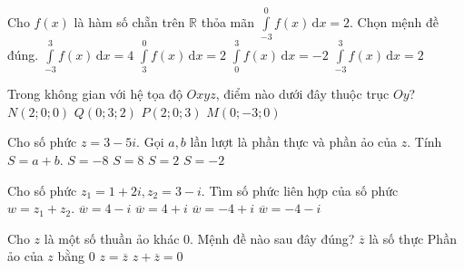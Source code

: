 \begin{ex}%
Cho $f(x)$ là hàm số chẵn trên $\mathbb{R}$ thỏa mãn $\displaystyle\int\limits_{-3}^0f(x)\mathrm{\,d}x=2$. Chọn mệnh đề đúng.
\choice
{\True $\displaystyle\int\limits_{-3}^3f(x)\mathrm{\,d}x=4$}
{$\displaystyle\int\limits_{3}^0f(x)\mathrm{\,d}x=2$}
{$\displaystyle\int\limits_{0}^3f(x)\mathrm{\,d}x=-2$}
{$\displaystyle\int\limits_{-3}^3f(x)\mathrm{\,d}x=2$}
\end{ex}

\begin{ex}%
Trong không gian với hệ tọa độ $Oxyz$, điểm nào dưới đây thuộc trục $Oy$?
\choice
{$N(2;0;0)$}
{$Q(0;3;2)$}
{$P(2;0;3)$}
{\True $M(0;-3;0)$}
\end{ex}

\begin{ex}%
Cho số phức $z=3-5i$. Gọi $a,b$ lần lượt là phần thực và phần ảo của $z$. Tính $S=a+b$.
\choice
{$S=-8$}
{$S=8$}
{$S=2$}
{\True $S=-2$}
\end{ex}

\begin{ex}%
Cho số phức $z_1=1+2i,z_2=3-i$. Tìm số phức liên hợp của số phức $w=z_1+z_2$.
\choice
{\True $\overline{w}=4-i$}
{$\overline{w}=4+i$}
{$\overline{w}=-4+i$}
{$\overline{w}=-4-i$}
\end{ex}

\begin{ex}%
Cho $z$ là một số thuần ảo khác $0$. Mệnh đề nào sau đây đúng?
\choice
{$\overline{z}$ là số thực}
{Phần ảo của $z$ bằng $0$}
{$z=\overline{z}$}
{\True $z+\overline{z}=0$}
\end{ex}


